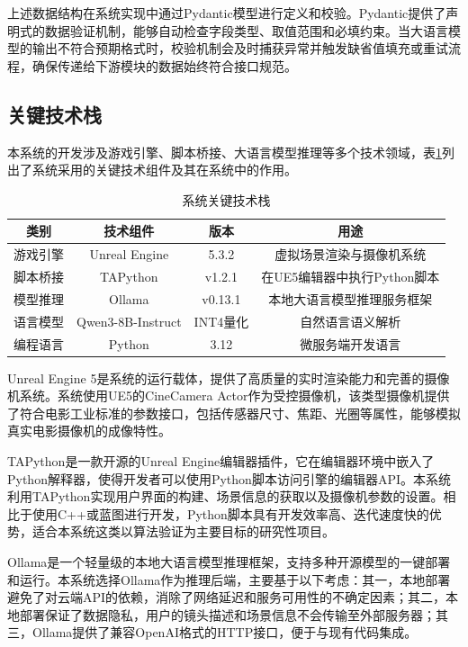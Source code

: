 上述数据结构在系统实现中通过Pydantic模型进行定义和校验。Pydantic提供了声明式的数据验证机制，能够自动检查字段类型、取值范围和必填约束。当大语言模型的输出不符合预期格式时，校验机制会及时捕获异常并触发缺省值填充或重试流程，确保传递给下游模块的数据始终符合接口规范。

\subsection{关键技术栈}

本系统的开发涉及游戏引擎、脚本桥接、大语言模型推理等多个技术领域，表\ref{tab:tech_stack}列出了系统采用的关键技术组件及其在系统中的作用。

\begin{table}[htbp]
\centering
\caption{系统关键技术栈}
\label{tab:tech_stack}
\begin{tabular}{cccc}
\toprule
类别 & 技术组件 & 版本 & 用途 \\
\midrule
游戏引擎 & Unreal Engine & 5.3.2 & 虚拟场景渲染与摄像机系统 \\
脚本桥接 & TAPython & v1.2.1 & 在UE5编辑器中执行Python脚本 \\
模型推理 & Ollama & v0.13.1 & 本地大语言模型推理服务框架 \\
语言模型 & Qwen3-8B-Instruct & INT4量化 & 自然语言语义解析 \\
编程语言 & Python & 3.12 & 微服务端开发语言 \\
\bottomrule
\end{tabular}
\end{table}

Unreal Engine 5是系统的运行载体，提供了高质量的实时渲染能力和完善的摄像机系统。系统使用UE5的CineCamera Actor作为受控摄像机，该类型摄像机提供了符合电影工业标准的参数接口，包括传感器尺寸、焦距、光圈等属性，能够模拟真实电影摄像机的成像特性。

TAPython是一款开源的Unreal Engine编辑器插件，它在编辑器环境中嵌入了Python解释器，使得开发者可以使用Python脚本访问引擎的编辑器API。本系统利用TAPython实现用户界面的构建、场景信息的获取以及摄像机参数的设置。相比于使用C++或蓝图进行开发，Python脚本具有开发效率高、迭代速度快的优势，适合本系统这类以算法验证为主要目标的研究性项目。

Ollama是一个轻量级的本地大语言模型推理框架，支持多种开源模型的一键部署和运行。本系统选择Ollama作为推理后端，主要基于以下考虑：其一，本地部署避免了对云端API的依赖，消除了网络延迟和服务可用性的不确定因素；其二，本地部署保证了数据隐私，用户的镜头描述和场景信息不会传输至外部服务器；其三，Ollama提供了兼容OpenAI格式的HTTP接口，便于与现有代码集成。

